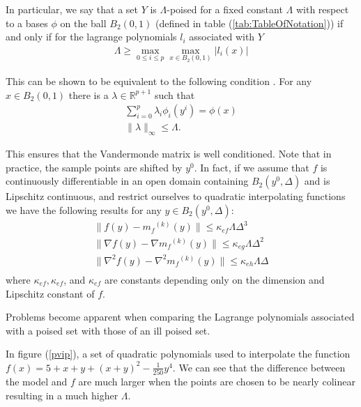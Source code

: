 \documentclass{article}
\theoremstyle{case}
\newcommand{\modelk}{{{m}_f}^{(k)}}
\let\oldref\ref
\renewcommand{\ref}[1]{(\oldref{#1})}
\begin{document}
In particular, we say that a set $Y$ is $\Lambda$-poised for a fixed constant $\Lambda$ with respect to a bases $\phi$ on the ball 
$B_2(0, 1)$ (defined in table \ref{tab:TableOfNotation}) if and only if for the lagrange polynomials $l_i$ associated with $Y$
\begin{align}
\Lambda \ge \max_{0\le i\le p}\max_{x\in B_2(0, 1)}|l_i(x)|
\end{align}

This can be shown to be equivalent to the following condition \cite{DUMMY:intro_book}.
For any $x \in B_2(0, 1)$ there is a $\lambda \in \mathbb R ^ {p+1}$ such that 
\begin{align}
\sum_{i=0}^p\lambda_i\phi_i(y^i) = \phi(x) \\
\|\lambda\|_{\infty} \le \Lambda.
\end{align}

This ensures that the Vandermonde matrix is well conditioned.
Note that in practice, the sample points are shifted by $y^0$.
In fact, if we assume that $f$ is continuously differentiable in an open domain containing $B_2(y^0, \Delta)$ and is Lipschitz continuous, and restrict ourselves to quadratic interpolating functions we have the following results for any $y \in B_2(y^0, \Delta)$:
\begin{align}
 \|f(y) - \modelk(y)\| \le \kappa_{ef} \Lambda \Delta^3 \\
 \|\nabla f(y) - \nabla \modelk(y)\| \le \kappa_{eg} \Lambda \Delta^2 \\
 \|\nabla^2 f(y) - \nabla^2 \modelk(y)\| \le \kappa_{eh}\Lambda \Delta \\
\end{align}
where
$\kappa_{ef}, \kappa_{ef}$, and $\kappa_{ef}$ are constants depending only on the dimension and Lipschitz constant of $f$.

Problems become apparent when comparing the Lagrange polynomials associated with a poised set with those of an ill poised set.

In figure \ref{pvip}, a set of quadratic polynomials used to interpolate the function $f(x) = 5 + x + y + (x + y) ^ 2 - \frac 1 {250} y ^ 4$.
We can see that the difference between the model and $f$ are much larger when the points are chosen to be nearly colinear resulting in a much higher $\Lambda$.
\end{document}
